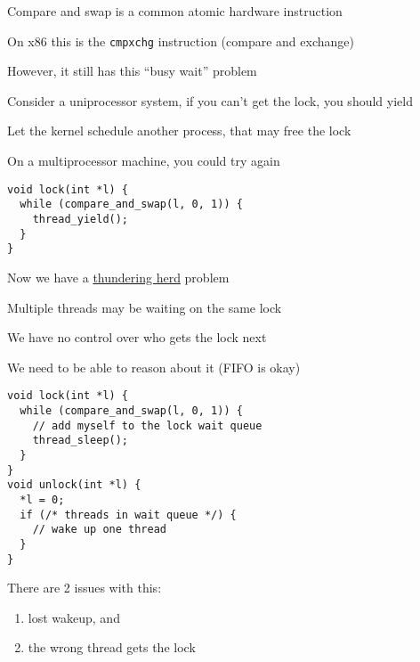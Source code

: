   \begin{slide}


    Compare and swap is a common atomic hardware instruction
    \medskip

    On x86 this is the \texttt{cmpxchg} instruction (compare and exchange)
    \medskip

    However, it still has this ``busy wait'' problem
    \medskip

    Consider a uniprocessor system, if you can't get the lock, you should yield

    \leftspace{}Let the kernel schedule another process, that may free the lock
    \medskip

    On a multiprocessor machine, you could try again

  \end{slide}

  \begin{slide}


    \begin{verbatim}
void lock(int *l) {
  while (compare_and_swap(l, 0, 1)) {
    thread_yield();
  }
}
    \end{verbatim}

    Now we have a 
    \href{https://en.wikipedia.org/wiki/Thundering_herd_problem}{thundering herd}
    problem

    \leftspace{}Multiple threads may be waiting on the same lock
    \medskip

    We have no control over who gets the lock next

    \leftspace{}We need to be able to reason about it (FIFO is okay)

  \end{slide}

  \begin{slide}


    \begin{verbatim}
void lock(int *l) {
  while (compare_and_swap(l, 0, 1)) {
    // add myself to the lock wait queue
    thread_sleep();
  }
}
void unlock(int *l) {
  *l = 0;
  if (/* threads in wait queue */) {
    // wake up one thread
  }
}
    \end{verbatim}
    \medskip

    There are 2 issues with this:
    
    \begin{enumerate}
      \item lost wakeup, and
      \item the wrong thread gets the lock
    \end{enumerate}
  \end{slide}

